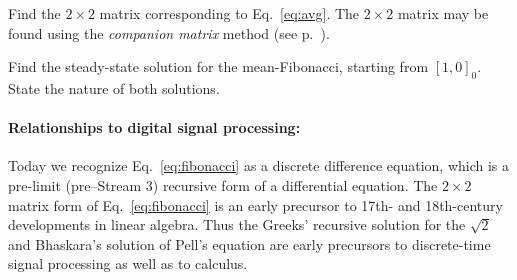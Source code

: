 \documentclass{ximera}
\begin{document}
\BEx %
Find the $2\times 2$ matrix corresponding to Eq.~\ref{eq:avg}.  The $2\times 2$ matrix may be found using the
\emph{companion matrix} method  (see p.~\pageref{sect:CompanionMatrix}).

\EEx

\BEx %
Find the steady-state solution for the mean-Fibonacci, starting from $[1,0]_0$. State the
nature of both solutions.

\EEx

\paragraph{Relationships to digital signal processing:}
Today we recognize Eq.~\ref{eq:fibonacci} as a discrete difference equation, which is a pre-limit
(pre--Stream 3) recursive form of a differential equation.
The $2\times 2$ matrix form of Eq.~\ref{eq:fibonacci} is an early precursor
to 17th- and 18th-century
developments in linear algebra.  
Thus the Greeks' recursive solution for the $\sqrt{2}$ and Bhaskara's solution of
Pell's equation are early precursors to discrete-time signal processing as well as to calculus.
\end{document}
